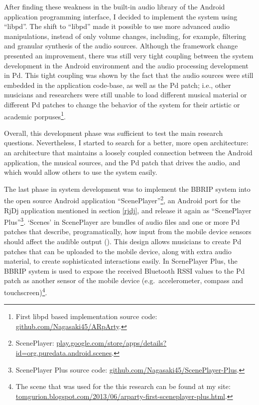 \documentclass[a4paper,11pt]{article}
\begin{document}
{After finding these weakness in the built-in audio library of the Android application programming interface, I decided to implement the system using ``libpd''.
The shift to ``libpd'' made it possible to use more advanced audio manipulations, instead of only volume changes, including, for example, filtering and granular synthesis of the audio sources.
Although the framework change presented an improvement, there was still very tight coupling between the system development in the Android environment and the audio processing development in Pd.
This tight coupling was shown by the fact that the audio sources were still embedded in the application code-base, as well as the Pd patch;
i.e., other musicians and researchers were still unable to load different musical material or different Pd patches to change the behavior of the system for their artistic or academic porpuses\footnote{First libpd based implementation source code: \href{https://github.com/Nagasaki45/ARpArty}{github.com/Nagasaki45/ARpArty}.}.

Overall, this development phase was sufficient to test the main research questions.
Nevertheless, I started to search for a better, more open architecture:
an architecture that maintains a loosely coupled connection between the Android application, the musical sources, and the Pd patch that drives the audio, and which would allow others to use the system easily.

The last phase in system development was to implement the BBRIP system into the open source Android application ``ScenePlayer''\footnote{ScenePlayer: \href{http://play.google.com/store/apps/details?id=org.puredata.android.scenes}{play.google.com/store/apps/details?id=org.puredata.android.scenes}.}, an Android port for the RjDj application mentioned in section \ref{rjdj}, and release it again as ``ScenePlayer Plus''\footnote{ScenePlayer Plus source code: \href{https://github.com/Nagasaki45/ScenePlayer-Plus}{github.com/Nagasaki45/ScenePlayer-Plus}.}.
`Scenes' in ScenePlayer are bundles of audio files and one or more Pd patches that describe, programatically, how input from the mobile device sensors should affect the audible output (\cite[p. 29]{brinkmann12}).
This design allows musicians to create Pd patches that can be uploaded to the mobile device, along with extra audio material, to create sophisticated interactions easily.
In ScenePlayer Plus, the BBRIP system is used to expose the received Bluetooth RSSI values to the Pd patch as another sensor of the mobile device (e.g.\ accelerometer, compass and touchscreen)\footnote{The scene that was used for the this research can be found at my site: \href{http://tomgurion.blogspot.com/2013/06/arparty-first-sceneplayer-plus.html}{tomgurion.blogspot.com/2013/06/arparty-first-sceneplayer-plus.html}.}.

}
\end{document}
